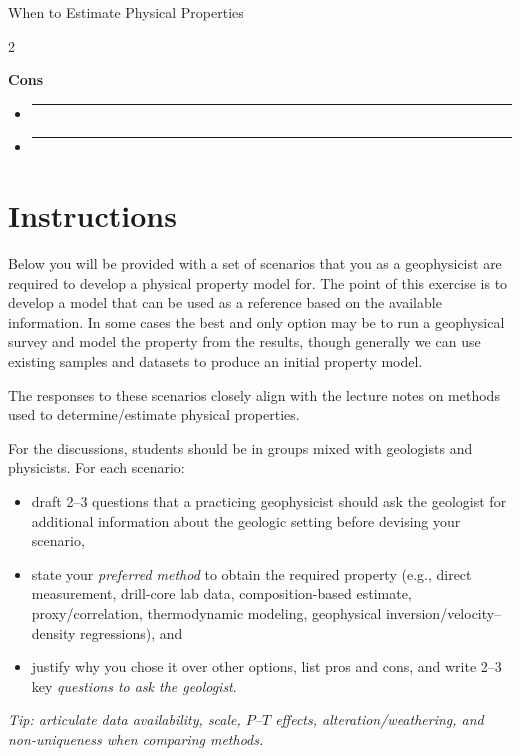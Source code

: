 \begin{activity}{When to Estimate Physical Properties}
{\begin{multicols}{2}
    \columnbreak

    \noindent\textbf{Cons}
    \begin{itemize}
        \setlength{\itemsep}{0.8em}
        \item \rule{0.88\linewidth}{0.4pt}
        \item \rule{0.88\linewidth}{0.4pt}
    \end{itemize}
    \end{multicols}
}

\section*{Instructions}

Below you will be provided with a set of scenarios that you as a geophysicist are required to develop a physical property model for.  The point of this exercise is to develop a model that can be used as a reference based on the available information.  In some cases the best and only option may be to run a geophysical survey and model the property from the results, though generally we can use existing samples and datasets to produce an initial property model.

The responses to these scenarios closely align with the lecture notes on methods used to determine/estimate physical properties.

For the discussions, students should be in groups mixed with geologists and physicists.   
 For each scenario:
 \begin{itemize}
    \item draft 2--3 questions that a practicing geophysicist should ask the geologist for additional information about the geologic setting before devising your scenario,
    \item state your \emph{preferred method} to obtain the required property (e.g., direct measurement, drill-core lab data, composition-based estimate, proxy/correlation, thermodynamic modeling, geophysical inversion/velocity--density regressions), and
    \item justify why you chose it over other options, list pros and cons, and write 2--3 key \emph{questions to ask the geologist}. 
 \end{itemize}
 
\textit{Tip: articulate data availability, scale, $P$--$T$ effects, alteration/weathering, and non-uniqueness when comparing methods.}


\end{activity}
